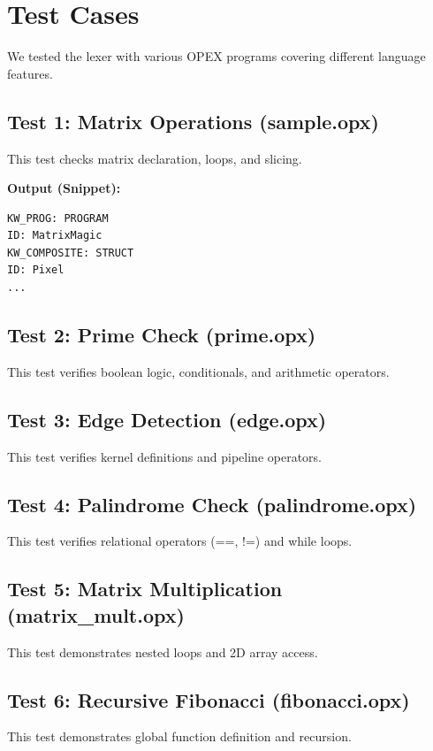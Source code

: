 \documentclass[12pt, a4paper]{article}
\begin{document}
\section{Test Cases}
We tested the lexer with various OPEX programs covering different language features.

\subsection{Test 1: Matrix Operations (sample.opx)}
This test checks matrix declaration, loops, and slicing.



\textbf{Output (Snippet):}
\begin{verbatim}
KW_PROG: PROGRAM
ID: MatrixMagic
KW_COMPOSITE: STRUCT
ID: Pixel
...
\end{verbatim}

\subsection{Test 2: Prime Check (prime.opx)}
This test verifies boolean logic, conditionals, and arithmetic operators.



\subsection{Test 3: Edge Detection (edge.opx)}
This test verifies kernel definitions and pipeline operators.



\subsection{Test 4: Palindrome Check (palindrome.opx)}
This test verifies relational operators (==, !=) and while loops.



\subsection{Test 5: Matrix Multiplication (matrix\_mult.opx)}
This test demonstrates nested loops and 2D array access.



\subsection{Test 6: Recursive Fibonacci (fibonacci.opx)}
This test demonstrates global function definition and recursion.


\end{document}
